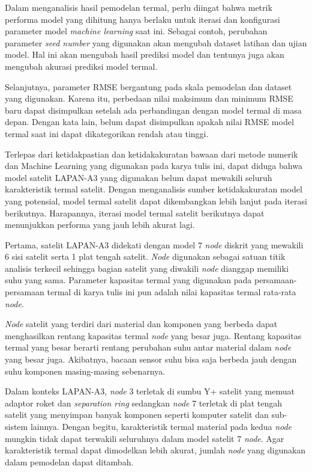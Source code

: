 Dalam menganalisis hasil pemodelan termal, perlu diingat bahwa metrik performa
model yang dihitung hanya berlaku untuk iterasi dan konfigurasi parameter model
\textit{machine learning} saat ini. Sebagai contoh, perubahan parameter
\textit{seed number} yang digunakan akan mengubah dataset latihan dan ujian
model. Hal ini akan mengubah hasil prediksi model dan tentunya juga akan mengubah
akurasi prediksi model termal. 

Selanjutnya, parameter RMSE bergantung pada skala pemodelan dan dataset yang
digunakan. Karena itu, perbedaan nilai maksimum dan minimum RMSE baru dapat
disimpulkan setelah ada perbandingan dengan model termal di masa depan. Dengan
kata lain, belum dapat disimpulkan apakah nilai RMSE model termal saat ini
dapat dikategorikan rendah atau tinggi.

Terlepas dari ketidakpastian dan ketidakakuratan bawaan dari metode numerik dan Machine
Learning yang digunakan pada karya tulis ini, dapat diduga bahwa model satelit LAPAN-A3 yang
digunakan belum dapat mewakili seluruh karakteristik termal satelit. Dengan
menganalisis sumber ketidakakuratan model yang potensial, model termal satelit
dapat dikembangkan lebih lanjut pada iterasi berikutnya. Harapannya, iterasi
model termal satelit berikutnya dapat menunjukkan performa yang jauh lebih
akurat lagi.

Pertama, satelit LAPAN-A3 didekati dengan model 7 \textit{node} diskrit yang
mewakili 6 sisi satelit serta 1 plat tengah satelit. \textit{Node} digunakan sebagai
satuan titik analisis terkecil sehingga bagian satelit yang diwakili \textit{node}
dianggap memiliki suhu yang sama. Parameter kapasitas termal yang digunakan
pada persamaan-persamaan termal di karya tulis ini pun adalah nilai kapasitas
termal rata-rata \textit{node}. 

\textit{Node} satelit yang terdiri dari material dan komponen yang berbeda dapat
menghasilkan rentang kapasitas termal \textit{node} yang besar juga. Rentang kapasitas
termal yang besar berarti rentang perubahan suhu antar material dalam \textit{node} yang
besar juga. Akibatnya, bacaan sensor suhu bisa saja berbeda jauh dengan suhu
komponen masing-masing sebenarnya.

Dalam konteks LAPAN-A3, \textit{node} 3 terletak di sumbu Y+ satelit yang memuat adaptor
roket dan \textit{separation ring} sedangkan \textit{node} 7 terletak di plat tengah
satelit yang menyimpan banyak komponen seperti komputer satelit dan sub-sistem
lainnya. Dengan begitu, karakteristik termal material pada kedua \textit{node} mungkin
tidak dapat terwakili seluruhnya dalam model satelit 7 \textit{node}. Agar karakteristik
termal dapat dimodelkan lebih akurat, jumlah \textit{node} yang digunakan dalam
pemodelan dapat ditambah.


